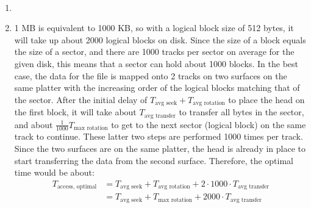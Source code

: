\documentclass[12pt]{article}
\newenvironment{sol}[1][Solution]{\begin{trivlist}
		\item[\hskip \labelsep {\bfseries #1:}]}{\end{trivlist}}
\begin{document}
\begin{sol}
	\
	\begin{enumerate}[label=(\alph*)]
		\item
		\item 1 MB is equivalent to 1000 KB, so with a logical block size of 512 bytes, it will
		take up about 2000 logical blocks on disk. Since the size of a block equals the size of a
		sector, and there are 1000 tracks per sector on average for the given disk, this means
		that a sector can hold about 1000 blocks. In the best case, the data for the file is
		mapped onto 2 tracks on two surfaces on the same platter with the increasing order of the logical blocks matching that of the sector. After the initial delay of
		$T_{\text{avg seek}} + T_{\text{avg rotation}}$ to place the head on the first block, it
		will take about $T_{\text{avg transfer}}$ to transfer all bytes in the sector, and about
		$\frac{1}{1000}T_{\text{max rotation}}$ to get to the next sector (logical block) on the
		same track to continue. These latter two steps are performed 1000 times per track. Since
		the two surfaces are on the same platter, the head is already in place to start
		transferring the data from the second surface. Therefore, the optimal time would be about:
		\begin{align*}
		T_{\text{access, optimal}}
		&=T_{\text{avg seek}} + T_{\text{avg rotation}}
		+2\cdot 1000\cdot T_{\text{avg transfer}}\\
		&=T_{\text{avg seek}} + T_{\text{max rotation}} + 2000\cdot T_{\text{avg transfer}}
		\end{align*}
		

\end{enumerate}
\end{sol}
\end{document}

